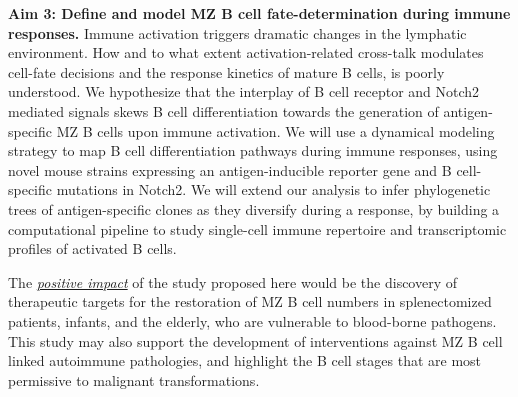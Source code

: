 \documentclass[11pt]{article} %
\begin{document}
\textbf{Aim 3: Define and model MZ B cell fate-determination during immune responses.} 
Immune activation triggers dramatic changes in the lymphatic environment.
How and to what extent activation-related cross-talk modulates cell-fate decisions and the response kinetics of mature B cells, is poorly understood.
We hypothesize that the interplay of B cell receptor and Notch2 mediated signals skews B cell differentiation towards the generation of antigen-specific MZ B cells upon immune activation.
We will use a dynamical modeling strategy to map B cell differentiation pathways during immune responses, using novel mouse strains expressing an antigen-inducible reporter gene and B cell-specific mutations in  Notch2.  %
We will extend our analysis to infer phylogenetic trees of antigen-specific clones as they diversify during a response, by building a computational pipeline to study single-cell immune repertoire and transcriptomic profiles of activated B cells. %


The \textit{\underline{positive impact}} of the study proposed here would be the discovery of therapeutic targets for the restoration of MZ B cell numbers in splenectomized patients, infants, and the elderly, who are vulnerable to blood-borne pathogens. 
This study may also support the development of interventions against MZ B cell linked autoimmune pathologies, and highlight the B cell stages that are most permissive to malignant transformations.
\end{document}
